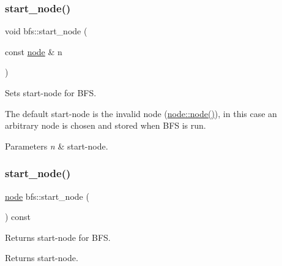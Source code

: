 \subsubsection{\texorpdfstring{start\+\_\+node()}{start\_node()}\hspace{0.1cm}{\footnotesize\ttfamily [1/2]}}
{\footnotesize\ttfamily void bfs\+::start\+\_\+node (\begin{DoxyParamCaption}\item[{const \mbox{\hyperlink{classnode}{node}} \&}]{n }\end{DoxyParamCaption})\hspace{0.3cm}{\ttfamily [inline]}}



Sets start-\/node for B\+FS. 

The default start-\/node is the invalid node (\mbox{\hyperlink{classnode_ad603259398d5667e3b97a6322a2bcc20}{node\+::node()}}), in this case an arbitrary node is chosen and stored when B\+FS is run.


\begin{DoxyParams}{Parameters}
{\em n} & start-\/node. \\
\hline
\end{DoxyParams}
\mbox{\label{classbfs_afac59b4a0d92449d8fa46a202b11ae4b}} 
\subsubsection{\texorpdfstring{start\+\_\+node()}{start\_node()}\hspace{0.1cm}{\footnotesize\ttfamily [2/2]}}
{\footnotesize\ttfamily \mbox{\hyperlink{classnode}{node}} bfs\+::start\+\_\+node (\begin{DoxyParamCaption}{ }\end{DoxyParamCaption}) const\hspace{0.3cm}{\ttfamily [inline]}}



Returns start-\/node for B\+FS. 

\begin{DoxyReturn}{Returns}
start-\/node. 
\end{DoxyReturn}
\mbox{\label{classbfs_a7de47b820fb9532f497660f767c9457f}} 

